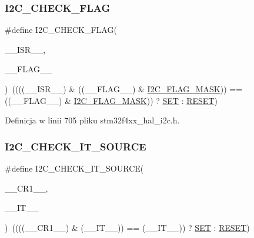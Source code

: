 \subsubsection{\texorpdfstring{I2\+C\+\_\+\+C\+H\+E\+C\+K\+\_\+\+F\+L\+AG}{I2C\_CHECK\_FLAG}}
{\footnotesize\ttfamily \#define I2\+C\+\_\+\+C\+H\+E\+C\+K\+\_\+\+F\+L\+AG(\begin{DoxyParamCaption}\item[{}]{\+\_\+\+\_\+\+I\+S\+R\+\_\+\+\_\+,  }\item[{}]{\+\_\+\+\_\+\+F\+L\+A\+G\+\_\+\+\_\+ }\end{DoxyParamCaption})~((((\+\_\+\+\_\+\+I\+S\+R\+\_\+\+\_\+) \& ((\+\_\+\+\_\+\+F\+L\+A\+G\+\_\+\+\_\+) \& \hyperlink{group___i2_c___private___constants_gafbc0a6e4113be03100fbae1314a8b395}{I2\+C\+\_\+\+F\+L\+A\+G\+\_\+\+M\+A\+SK})) == ((\+\_\+\+\_\+\+F\+L\+A\+G\+\_\+\+\_\+) \& \hyperlink{group___i2_c___private___constants_gafbc0a6e4113be03100fbae1314a8b395}{I2\+C\+\_\+\+F\+L\+A\+G\+\_\+\+M\+A\+SK})) ? \hyperlink{group___exported__types_gga89136caac2e14c55151f527ac02daaffab44c8101cc294c074709ec1b14211792}{S\+ET} \+: \hyperlink{group___exported__types_gga89136caac2e14c55151f527ac02daaffa589b7d94a3d91d145720e2fed0eb3a05}{R\+E\+S\+ET})}



Definicja w linii 705 pliku stm32f4xx\+\_\+hal\+\_\+i2c.\+h.

\mbox{\label{group___i2_c___i_s___r_t_c___definitions_gacc7c83a67d99d759923c6907f1a1751f}} 
\subsubsection{\texorpdfstring{I2\+C\+\_\+\+C\+H\+E\+C\+K\+\_\+\+I\+T\+\_\+\+S\+O\+U\+R\+CE}{I2C\_CHECK\_IT\_SOURCE}}
{\footnotesize\ttfamily \#define I2\+C\+\_\+\+C\+H\+E\+C\+K\+\_\+\+I\+T\+\_\+\+S\+O\+U\+R\+CE(\begin{DoxyParamCaption}\item[{}]{\+\_\+\+\_\+\+C\+R1\+\_\+\+\_\+,  }\item[{}]{\+\_\+\+\_\+\+I\+T\+\_\+\+\_\+ }\end{DoxyParamCaption})~((((\+\_\+\+\_\+\+C\+R1\+\_\+\+\_\+) \& (\+\_\+\+\_\+\+I\+T\+\_\+\+\_\+)) == (\+\_\+\+\_\+\+I\+T\+\_\+\+\_\+)) ? \hyperlink{group___exported__types_gga89136caac2e14c55151f527ac02daaffab44c8101cc294c074709ec1b14211792}{S\+ET} \+: \hyperlink{group___exported__types_gga89136caac2e14c55151f527ac02daaffa589b7d94a3d91d145720e2fed0eb3a05}{R\+E\+S\+ET})}



